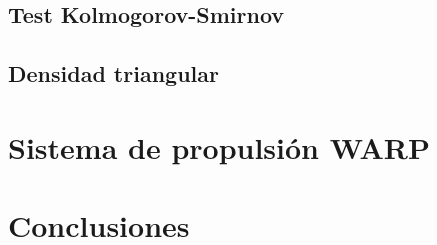 \documentclass{sig-alternate}
\begin{document}
\subsection{Test Kolmogorov-Smirnov}\label{testks}

\subsection{Densidad triangular}\label{triangular}

\section{Sistema de propulsi\'{o}n WARP}\label{simulacionpropulsor}

\section{Conclusiones}\label{conclusiones}
\end{document}
